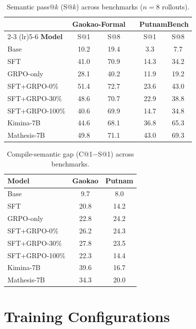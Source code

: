 \documentclass[11pt,a4paper]{article}
\begin{document}
\begin{table}[H]
\centering
\small
\caption{Semantic pass@$k$ (S@$k$) across benchmarks ($n{=}8$ rollouts).}
\label{tab:full_semantic}
\begin{tabular}{@{}l cc c cc@{}}
\toprule
& \multicolumn{2}{c}{\textbf{Gaokao-Formal}} && \multicolumn{2}{c}{\textbf{PutnamBench}} \\
\cmidrule(lr){2-3} \cmidrule(lr){5-6}
\textbf{Model} & S@1 & S@8 && S@1 & S@8 \\
\midrule
Base & 10.2 & 19.4 && 3.3 & 7.7 \\
SFT & 41.0 & 70.9 && 14.3 & 34.2 \\
GRPO-only & 28.1 & 40.2 && 11.9 & 19.2 \\
\addlinespace[2pt]
SFT+GRPO-0\% & 51.4 & 72.7 && 23.6 & 43.0 \\
SFT+GRPO-30\% & 48.6 & 70.7 && 22.9 & 38.8 \\
SFT+GRPO-100\% & 40.6 & 69.9 && 14.7 & 34.8 \\
\addlinespace[2pt]
Kimina-7B & 44.6 & 68.1 && 36.8 & 65.3 \\
Mathesis-7B & 49.8 & 71.1 && 43.0 & 69.3 \\
\bottomrule
\end{tabular}
\end{table}

\begin{table}[H]
\centering
\small
\caption{Compile-semantic gap (C@1$-$S@1) across benchmarks.}
\label{tab:cs_gap_full}
\begin{tabular}{@{}l cc@{}}
\toprule
\textbf{Model} & \textbf{Gaokao} & \textbf{Putnam} \\
\midrule
Base & 9.7 & 8.0 \\
SFT & 20.8 & 14.2 \\
GRPO-only & 22.8 & 24.2 \\
SFT+GRPO-0\% & 26.2 & 24.3 \\
SFT+GRPO-30\% & 27.8 & 23.5 \\
SFT+GRPO-100\% & 22.3 & 14.4 \\
\addlinespace[2pt]
Kimina-7B & 39.6 & 16.7 \\
Mathesis-7B & 34.3 & 20.0 \\
\bottomrule
\end{tabular}
\end{table}

\section{Training Configurations}\label{app:configs}
\end{document}
